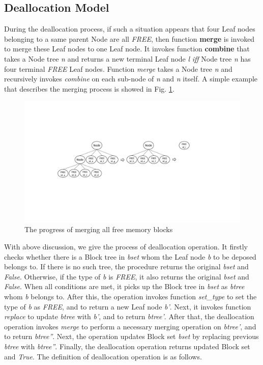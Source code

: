 \subsection{Deallocation Model}
During the deallocation process, if such a situation appears that four Leaf nodes belonging to a same parent Node are all \emph{FREE}, then function \textbf{merge} is invoked to merge these Leaf nodes to one Leaf node. It invokes function \textbf{combine} that takes a Node tree \emph{n} and returns a new terminal Leaf node \emph{l} \emph{iff} Node tree \emph{n} has four terminal \emph{FREE} Leaf nodes. Function \emph{merge} takes a Node tree \emph{n} and recursively invokes \emph{combine} on each sub-node of \emph{n} and \emph{n} itself. A simple example that describes the merging process is showed in Fig. \ref{fig2}.

\begin{figure}[htbp]
	\centering
	\includegraphics[width=1\textwidth]{fig2.pdf}
	\caption{The progress of merging all free memory blocks}
	\label{fig2}
\end{figure}

With above discussion, we give the process of deallocation operation. It firstly checks whether there is a Block tree in \emph{bset} whom the Leaf node \emph{b} to be deposed belongs to. If there is no such tree, the procedure returns the original \emph{bset} and \emph{False}. Otherwise, if the type of \emph{b} is \emph{FREE}, it also returns the original \emph{bset} and \emph{False}. When all conditions are met, it picks up the Block tree in \emph{bset} as \emph{btree} whom \emph{b} belongs to. After this, the operation invokes function \emph{set\_type} to set the type of \emph{b} as \emph{FREE}, and to return a new Leaf node \emph{b'}. Next, it invokes function \emph{replace} to update \emph{btree} with \emph{b'}, and to return \emph{btree'}. After that, the deallocation operation invokes \emph{merge} to perform a necessary merging operation on \emph{btree'}, and to return \emph{btree''}. Next, the operation updates Block set \emph{bset} by replacing previous \emph{btree} with \emph{btree''}. Finally, the deallocation operation returns updated Block set and \emph{True}. The definition of deallocation operation is as follows.

